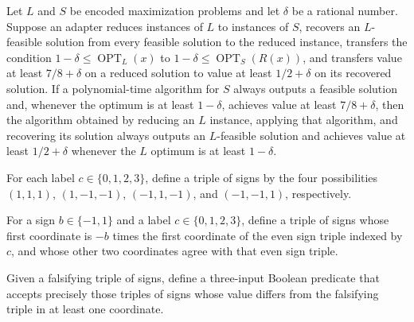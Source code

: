 \begin{theorem}
\label{FABL.E3LinE3SatPolytimeAdapter.transferApproximation}
\leanok
{}
Let $L$ and $S$ be encoded maximization problems and let $\delta$ be a rational number.
Suppose an adapter reduces instances of $L$ to instances of $S$, recovers an
$L$-feasible solution from every feasible solution to the reduced instance, transfers
the condition $1-\delta \leq \operatorname{OPT}_L(x)$ to
$1-\delta \leq \operatorname{OPT}_S(R(x))$, and transfers value at least
$7/8+\delta$ on a reduced solution to value at least $1/2+\delta$ on its
recovered solution. If a polynomial-time algorithm for $S$ always outputs a feasible
solution and, whenever the optimum is at least $1-\delta$, achieves value at least
$7/8+\delta$, then the algorithm obtained by reducing an $L$ instance, applying that
algorithm, and recovering its solution always outputs an $L$-feasible solution and
achieves value at least $1/2+\delta$ whenever the $L$ optimum is at least $1-\delta$.
\end{theorem}

\begin{definition}
\label{FABL.evenSignTriple}
\leanok
{}
For each label $c\in\{0,1,2,3\}$, define a triple of signs by the four possibilities
$(1,1,1)$, $(1,-1,-1)$, $(-1,1,-1)$, and $(-1,-1,1)$, respectively.
\end{definition}

\begin{definition}
\label{FABL.e3LinFalsifyingSign}
\leanok
{}
For a sign $b\in\{-1,1\}$ and a label $c\in\{0,1,2,3\}$, define a triple of signs whose
first coordinate is $-b$ times the first coordinate of the even sign triple indexed by
$c$, and whose other two coordinates agree with that even sign triple.
\end{definition}

\begin{definition}
\label{FABL.e3SatSignClause}
\leanok
{}
Given a falsifying triple of signs, define a three-input Boolean predicate that accepts
precisely those triples of signs whose value differs from the falsifying triple in at
least one coordinate.
\end{definition}

